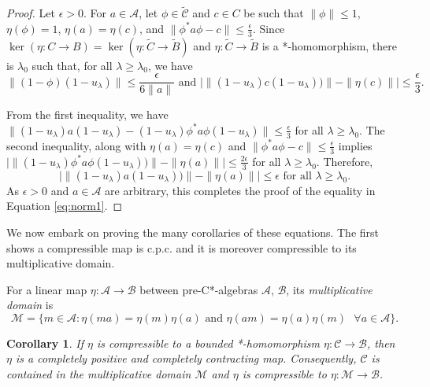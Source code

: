 \documentclass[a4paper, 12pt]{amsart}
\newtheorem{cor}[thm]{Corollary}
\theoremstyle{definition}
\theoremstyle{remark}
\numberwithin{equation}{section}
\begin{document}
\begin{proof}
Let $\epsilon > 0$. For $a\in \mathcal{A}$, let $\phi\in\tilde{\mathcal{C}}$ and $c\in C$ be such that $\|\phi\|\leq 1$, $\eta(\phi) = 1$, $\eta(a) = \eta(c)$, and $\|\phi^{*} a\phi  - c\|\leq \frac{\epsilon}{3}$. Since $\ker(\eta:C\to B) = \ker(\eta: \tilde{C}\to\tilde{B})$ and $\eta:\tilde{C}\to\tilde{B}$ is a *-homomorphism, there is $\lambda_{0}$ such that, for all $\lambda\geq \lambda_{0}$, we have $$\|(1-\phi)(1-u_{\lambda})\| \leq \frac{\epsilon}{6\|a\|}\text{ and }\big| \|(1-u_{\lambda})c(1-u_{\lambda}))\| - \|\eta(c)\|\big|\leq \frac{\epsilon}{3}.$$

From the first inequality, we have $\|(1-u_{\lambda})a(1-u_{\lambda}) - (1-u_{\lambda})\phi^{*} a \phi (1-u_{\lambda})\|\leq\frac{\epsilon}{3}$ for all $\lambda\geq \lambda_{0}$. The second inequality, along with $\eta(a) = \eta(c)$ and $\|\phi^{*}a\phi - c\|\leq \frac{\epsilon}{3}$ implies $\big| \|(1-u_{\lambda})\phi^{*}a\phi(1-u_{\lambda}))\| - \|\eta(a)\|\big|\leq \frac{2\epsilon}{3}$ for all $\lambda\geq \lambda_{0}$. Therefore,$$\big| \|(1-u_{\lambda})a(1-u_{\lambda}))\| - \|\eta(a)\|\big|\leq \epsilon\text{ for all }\lambda\geq \lambda_{0}.$$ As $\epsilon > 0$ and $a\in\mathcal{A}$ are arbitrary, this completes the proof of the equality in Equation \ref{eq:norm1}.
\end{proof}



We now embark on proving the many corollaries of these equations. The first shows a compressible map is c.p.c. and it is moreover compressible to its multiplicative domain.

For a linear map $\eta:\mathcal{A}\to\mathcal{B}$ between pre-C*-algebras $\mathcal{A}$, $\mathcal{B}$, its \emph{multiplicative domain} is $$\mathcal{M} = \{m\in \mathcal{A}: \eta(ma) = \eta(m)\eta(a)\text{ and } \eta(am) = \eta(a)\eta(m) \text{ }\forall a\in\mathcal{A}\}.$$
\begin{cor}
\label{cor:cpc}
    If $\eta$ is compressible to a bounded *-homomorphism $\eta:\mathcal{C}\to \mathcal{B}$, then $\eta$ is a completely positive and completely contracting map. Consequently, $\mathcal{C}$ is contained in the multiplicative domain $\mathcal{M}$ and $\eta$ is compressible to $\eta:\mathcal{M}\to\mathcal{B}$.
\end{cor}
\end{document}

